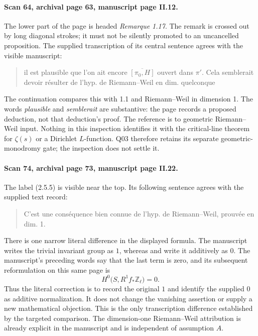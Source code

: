 \documentclass[11pt,a4paper]{article}
\theoremstyle{definition}
\begin{document}
\paragraph{Scan 64, archival page 63, manuscript page II.12.}
The lower part of the page is headed \emph{Remarque 1.17}.  The remark is
crossed out by long diagonal strokes; it must not be silently promoted to
an uncancelled proposition.  The supplied transcription of its central
sentence agrees with the visible manuscript:
\begin{quote}
il est plausible que l'on ait encore
\(\overline{[\pi_0,H]}\) ouvert dans \(\pi'\).
Cela semblerait devoir r\'esulter de l'hyp. de Riemann--Weil en
dim. quelconque
\end{quote}
The continuation compares this with 1.1 and Riemann--Weil in dimension 1.
The words \emph{plausible} and \emph{semblerait} are substantive: the page
records a proposed deduction, not that deduction's proof.  The reference
is to geometric Riemann--Weil input.  Nothing in this inspection identifies
it with the critical-line theorem for \(\zeta(s)\) or a Dirichlet
\(L\)-function.  Q03 therefore retains its separate geometric-monodromy
gate; the inspection does not settle it.

\paragraph{Scan 74, archival page 73, manuscript page II.22.}
The label (2.5.5) is visible near the top.  Its following sentence agrees
with the supplied text record:
\begin{quote}
C'est une cons\'equence bien connue de l'hyp. de Riemann--Weil,
prouv\'ee en dim. 1.
\end{quote}
There is one narrow literal difference in the displayed formula.  The
manuscript writes the trivial invariant group as \(1\), whereas
 and 
write it additively as \(0\).  The manuscript's preceding words say that
the last term is zero, and its subsequent reformulation on this same page
is
\[
 H^0\bigl(S,R^1f_*\mathbb Z_\ell\bigr)=0.
\]
Thus the literal correction is to record the original \(1\) and identify
the supplied \(0\) as additive normalization.  It does not change the
vanishing assertion or supply a new mathematical objection.  This is the
only transcription difference established by the targeted comparison.
The dimension-one Riemann--Weil attribution is already explicit in the
manuscript and is independent of assumption \(A\).
\end{document}
